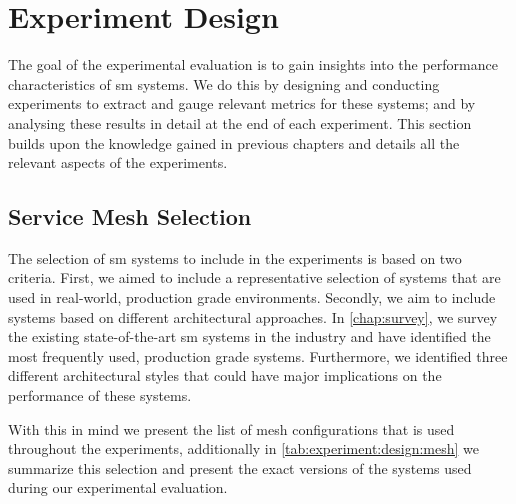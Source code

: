 \section{Experiment Design}
\label{sec:experiments:design}



The goal of the experimental evaluation is to gain insights into the performance characteristics of \gls{sm} systems. We do this by designing and conducting experiments to extract and gauge relevant metrics for these systems; and by analysing these results in detail at the end of each experiment. This section builds upon the knowledge gained in previous chapters and details all the relevant aspects of the experiments.



\subsection{Service Mesh Selection}
\label{sec:experiments:design:meshes}

The selection of \gls{sm} systems to include in the experiments is based on two criteria. First, we aimed to include a representative selection of systems that are used in real-world, production grade environments. Secondly, we aim to include systems based on different architectural approaches. In \cref{chap:survey}, we survey the existing state-of-the-art \gls{sm} systems in the industry and have identified the most frequently used, production grade systems. Furthermore, we identified three different architectural styles that could have major implications on the performance of these systems.



With this in mind we present the list of mesh configurations that is used throughout the experiments, additionally in \cref{tab:experiment:design:mesh} we summarize this selection and present the exact versions of the systems used during our experimental evaluation.

